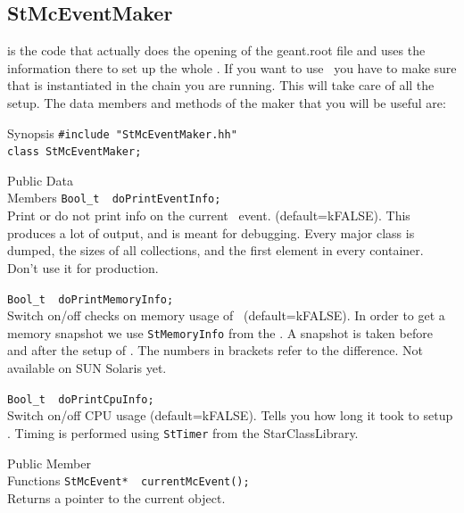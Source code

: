 \subsection{StMcEventMaker}
 is the code that actually does the opening of
the geant.root file and uses the information there to set up the
whole \StMcEvent .  If you want to use \StMcEvent\ you have to make
sure that  is instantiated in the chain you
are running.  This will take care of all the setup.  The data
members and methods of the maker that you will be useful are:

\label{sec:StMcEventMaker}
\begin{Entry}
\item[Synopsis]
    \verb+#include "StMcEventMaker.hh"+\\
    \verb+class StMcEventMaker;+\\

\item[Public Data\\ Members]
    \verb+Bool_t  doPrintEventInfo;+\\
    Print or do not print info on the current \StMcEvent\ event.
    (default=kFALSE).  This produces a lot of output, and is
    meant for debugging.  Every major
    class is dumped, the sizes of all collections, and the first
    element in every container. Don't use it for production.
    
    \verb+Bool_t  doPrintMemoryInfo;+\\
    Switch on/off checks on memory usage of \StMcEvent\
    (default=kFALSE).  In order to get a memory snapshot we use
    \texttt{StMemoryInfo} from the .  A
    snapshot is taken before and after the setup of \StEvent.  The
    numbers in brackets refer to the difference. Not available on SUN
    Solaris yet.
    
    \verb+Bool_t  doPrintCpuInfo;+\\
    Switch on/off CPU usage (default=kFALSE). Tells you how long it
    took to setup \StEvent. Timing is performed using \texttt{StTimer}
    from the StarClassLibrary.

\item[Public Member\\ Functions]
    \verb+StMcEvent*  currentMcEvent();+\\
    Returns a pointer to the current  object.
\end{Entry}

